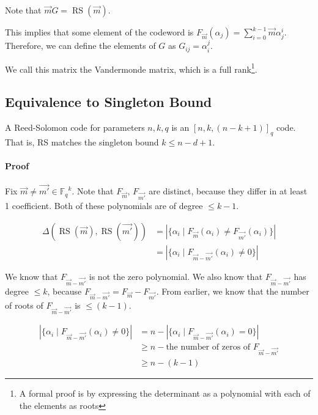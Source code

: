 \documentclass{idc_msc}
\newcommand{\Fq}[1][q]{{\mathbb{F}_{#1}}}
\DeclareMathOperator*{\RS}{RS}
\begin{document}
Note that \(\vec{m} G = \RS(\vec{m})\).

This implies that some element of the codeword is \(F_{\vec{m}}(\alpha_j) = \sum_{i=0}^{k-1} \vec{m} \alpha_j^i\).
Therefore, we can define the elements of \(G\) as \(G_{ij} = \alpha_i^j\).

We call this matrix the Vandermonde matrix, which is a full rank\footnote{A formal proof is by expressing the determinant as a polynomial with each of the elements as roots}.

\subsection{Equivalence to Singleton Bound}

A Reed-Solomon code for parameters \(n,k,q\) is an \([n,k,(n-k+1)]_q\) code.
That is, RS matches the singleton bound \(k \le n-d+1\).

\paragraph{Proof}

Fix \(\vec{m} \ne \vec{m'} \in \Fq^k\).
Note that \(F_{\vec{m}},\, F_{\vec{m'}}\) are distinct, because they differ in at least 1 coefficient.
Both of these polynomials are of degree \(\le k-1\).

\[
\begin{aligned}
  \Delta(\RS(\vec{m}), \RS(\vec{m'}))
  & = \left|\{ \alpha_i \mid F_{\vec{m}}(\alpha_i) \ne F_{\vec{m'}}(\alpha_i)\}\right| \\
  & = \left|\{ \alpha_i \mid F_{\vec{m} - \vec{m'}}(\alpha_i) \ne 0 \}\right|
\end{aligned}
\]

We know that \(F_{\vec{m} - \vec{m'}}\) is not the zero polynomial.
We also know that \(F_{\vec{m} - \vec{m'}}\) has degree \(\le k\), because \(F_{\vec{m} - \vec{m'}} = F_{\vec{m}} - F_{\vec{m'}}\).
From earlier, we know that the number of roots of \(F_{\vec{m} - \vec{m'}}\) is \(\le (k-1)\).

\[
\begin{aligned}
\left|\{ \alpha_i \mid F_{\vec{m} - \vec{m'}}(\alpha_i) \ne 0 \}\right|
& = n - \left|\{ \alpha_i \mid F_{\vec{m} - \vec{m'}}(\alpha_i) = 0 \}\right| \\
& \ge n - \text{the number of zeros of \(F_{\vec{m} - \vec{m'}}\)} \\
& \ge n - (k - 1)
\end{aligned}
\]
\end{document}
